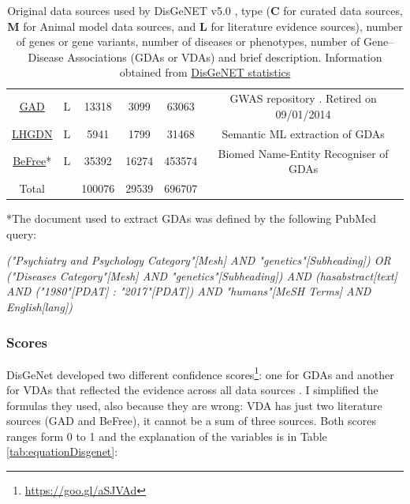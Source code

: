 \begin{table}[H]
{\begin{tabular}{c|c|c|c|c|c}
    \href{https://goo.gl/y3keCN}{GAD} &
    L & 13318 & 3099 & 63063 &
    GWAS repository \cite{gad2004}. Retired on 09/01/2014 \\
    
    \href{https://goo.gl/szDDw6}{LHGDN} &
    L & 5941 & 1799 & 31468 &
    Semantic ML extraction of GDAs \cite{bundschus2008} \\
    
    \href{https://goo.gl/4Yau27}{BeFree}* &
    L & 35392 & 16274 & 453574 &
    Biomed Name-Entity Recogniser of GDAs \cite{bravo2015} \\
    
    Total &  & 100076 & 29539 & 696707 \\
    
    \end{tabular}}
    \caption{Original data sources used by DisGeNET v5.0 \cite{DisGeNET2015}, type (\textbf{C} for curated data sources, \textbf{M} for Animal model data sources, and \textbf{L} for literature evidence sources), number of genes or gene variants, number of diseases or phenotypes, number of Gene--Disease Associations (GDAs or VDAs) and brief description. Information obtained from
    \href{https://goo.gl/ntXTjX}{DisGeNET statistics} \label{tab:disgenet_data}}
\end{table}

*The document used to extract GDAs was defined by the following PubMed query:

\begin{center}
\emph{
\small{
("Psychiatry and Psychology Category"[Mesh] AND "genetics"[Subheading]) OR ("Diseases Category"[Mesh] AND "genetics"[Subheading]) AND (hasabstract[text] AND ("1980"[PDAT] : "2017"[PDAT]) AND "humans"[MeSH Terms] AND English[lang])
}
}
\end{center}


\subsubsection{Scores}
DisGeNet developed two different confidence scores\footnote{\url{https://goo.gl/aSJVAd}}: one for GDAs and another for VDAs that reflected the evidence across all data sources \cite{DisGeNET2015}. I simplified the formulas they used, also because they are wrong: VDA has just two literature sources (GAD and BeFree), it cannot be a sum of three sources. Both scores ranges form 0 to 1 and the explanation of the variables is in Table \ref{tab:equationDisgenet}:

